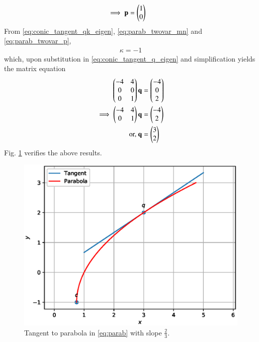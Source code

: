 \begin{enumerate}[label=\thesection.\arabic*.,ref=\thesection.\theenumi]
\begin{align}
\\
\implies \mathbf{p} &= \begin{pmatrix}1\\0\end{pmatrix}
\label{eq:parab_twovar_p}
\end{align}
From \eqref{eq:conic_tangent_qk_eigen}, \eqref{eq:parab_twovar_mn} and \eqref{eq:parab_twovar_p},
\begin{align}
\kappa = -1
\end{align}
which, upon substitution in \eqref{eq:conic_tangent_q_eigen} and simplification yields the matrix equation
\begin{align}
\begin{pmatrix}-4 & 4\\0 & 0\\0&1\end{pmatrix}\mathbf{q} &= \begin{pmatrix}-4\\0\\2\end{pmatrix}
\\
\implies \begin{pmatrix}-4 & 4\\0&1\end{pmatrix}\mathbf{q} &= \begin{pmatrix}-4\\2\end{pmatrix}
\\
\text{or, } \mathbf{q} &= \begin{pmatrix}3\\2\end{pmatrix}
\end{align}
Fig. \ref{fig:parab_tangent}	verifies the above results.
%
\begin{figure}[!ht]
\centering
\includegraphics[width=\columnwidth]{./figs/parab/parab_tangent.eps}
\caption{Tangent to  parabola in \eqref{eq:parab}  with slope $\frac{2}{3}$. }
\label{fig:parab_tangent}	
\end{figure}


\end{enumerate}
